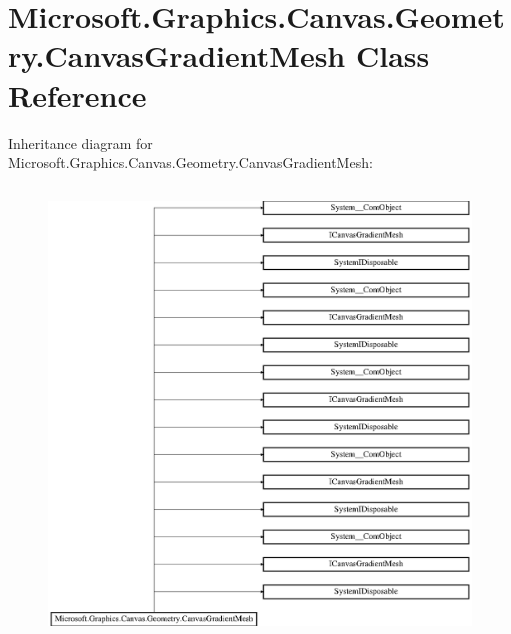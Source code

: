 \hypertarget{class_microsoft_1_1_graphics_1_1_canvas_1_1_geometry_1_1_canvas_gradient_mesh}{}\section{Microsoft.\+Graphics.\+Canvas.\+Geometry.\+Canvas\+Gradient\+Mesh Class Reference}
\label{class_microsoft_1_1_graphics_1_1_canvas_1_1_geometry_1_1_canvas_gradient_mesh}
Inheritance diagram for Microsoft.\+Graphics.\+Canvas.\+Geometry.\+Canvas\+Gradient\+Mesh\+:\begin{figure}[H]
\begin{center}
\leavevmode
\includegraphics[height=12.000000cm]{class_microsoft_1_1_graphics_1_1_canvas_1_1_geometry_1_1_canvas_gradient_mesh}
\end{center}
\end{figure}
